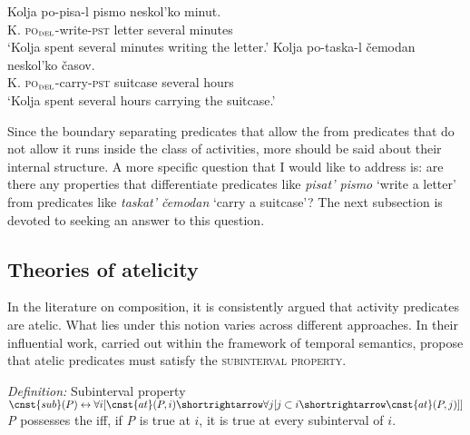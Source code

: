 \documentclass[output=paper,colorlinks,citecolor=brown,newtxmath]{langsci/langscibook}
\begin{document}
\ea \label{ex:naumov:23} 
\z \z

\ea \label{ex:naumov:24} \ea \label{ex:naumov:24a}
\gll  Kolja	po-pisa-l		pismo		neskol’ko	minut.\\
K. \textsc{po}$_\textsc{del}$-write-\textsc{pst}   letter		several		minutes    \\
\glt `Kolja spent several minutes writing the letter.'
\ex \label{ex:naumov:24b}
\gll Kolja	po-taska-l		čemodan	neskol’ko	časov. \\
K. \textsc{po}$_\textsc{del}$-carry-\textsc{pst} suitcase	several		hours \\
\glt `Kolja spent several hours carrying the suitcase.'
\z \z

\noindent Since the boundary separating predicates that allow the  from predicates that do not allow it runs inside the class of activities, more should be said about their internal structure. A more specific question that I would like to address is: are there any properties that differentiate predicates like \textit{pisat’ pismo} `write a letter’ from predicates like \textit{taskat’ čemodan} `carry a suitcase’? The next subsection is devoted to seeking an answer to this question.

\subsection{Theories of atelicity} \label{sec:naumov:3.4}

In the literature on  composition, it is consistently argued that activity predicates are atelic. What lies under this notion varies across different approaches. In their influential work, carried out within the framework of temporal semantics, \citet{bennett1978toward} propose that atelic predicates must satisfy the \textsc{subinterval property}.

\ea \label{ex:naumov:25}
\textit{Definition:} Subinterval property\smallskip\\
$\cnst{sub}(P) \leftrightarrow \forall i [\cnst{at}(P, i) \shortrightarrow \forall j[j \subset i \shortrightarrow \cnst{at}(P, j)]]$ \\
\textit{P} possesses the  iff, if \textit{P} is true at $i$, it is true at every subinterval of $i$.
\z
\end{document}
